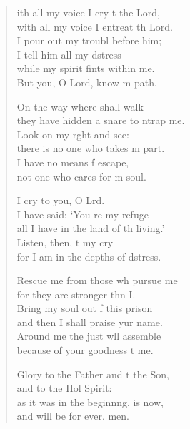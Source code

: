 \begin{verse}
  \begin{patverse}
ith all my voice I cry t the Lord,\Med\\
    with all my voice I entreat th Lord.\\
I pour out my troubl before him;\Med\\
    I tell him all my d\pointup{\i}stress\\
while my spirit fints within me.\Med\\
    But you, O Lord, know m path.

On the way where  shall walk\Med\\
    they have hidden a snare to ntrap me.\\
Look on my r\pointup{\i}ght and see:\Med\\
    there is no one who takes m part.\\
I have no means f escape,\Med\\
    not one who cares for m soul.

I cry to you, O Lrd.\Flex\\
    I have said: ‘You re my refuge\Med\\
    all I have in the land of th living.’\\
Listen, then, t my cry\Med\\
    for I am in the depths of d\pointup{\i}stress.

Rescue me from those wh pursue me\Med\\
    for they are stronger thn I.\\
Bring my soul out f this prison\Med\\
    and then I shall praise yur name.\\
Around me the just w\pointup{\i}ll assemble\Med\\
    because of your goodness t me.

Glory to the Father and t the Son,\Med\\
    and to the Hol Spirit:\\
as it was in the beginn\pointup{\i}ng, is now,\Med\\
    and will be for ever. men.
  \end{patverse}
\end{verse}
